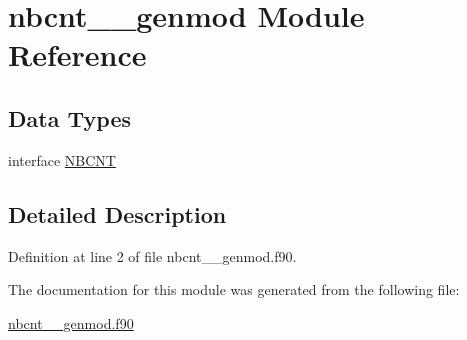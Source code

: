 \hypertarget{classnbcnt____genmod}{\section{nbcnt\+\_\+\+\_\+genmod Module Reference}
\label{classnbcnt____genmod}
}
\subsection*{Data Types}
\begin{DoxyCompactItemize}
\item 
interface \hyperlink{interfacenbcnt____genmod_1_1NBCNT}{N\+B\+C\+N\+T}
\end{DoxyCompactItemize}


\subsection{Detailed Description}


Definition at line 2 of file nbcnt\+\_\+\+\_\+genmod.\+f90.



The documentation for this module was generated from the following file\+:\begin{DoxyCompactItemize}
\item 
\hyperlink{nbcnt____genmod_8f90}{nbcnt\+\_\+\+\_\+genmod.\+f90}\end{DoxyCompactItemize}
